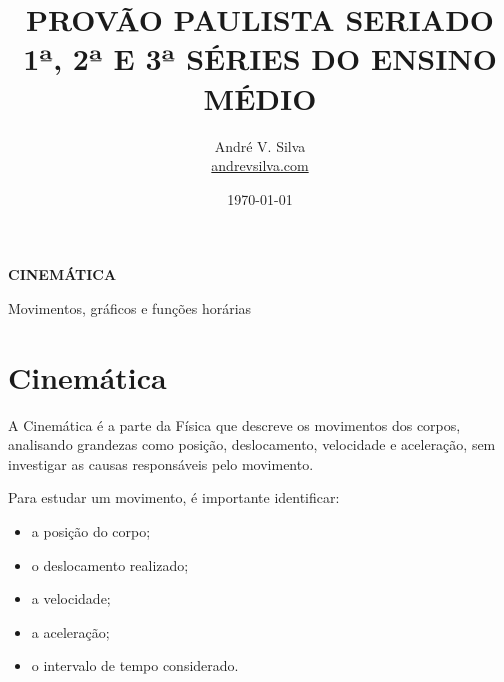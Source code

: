 \documentclass[a4paper,12pt]{article}
\title{
    \textbf{\large
    PROVÃO PAULISTA SERIADO\\[4pt]
    1ª, 2ª E 3ª SÉRIES DO ENSINO MÉDIO}
}
\author{
    André V. Silva\\[4pt]
    \href{https://andrevsilva.com/}{andrevsilva.com}
}
\date{\today}
\begin{document}

\maketitle

\begin{center}

\vspace{1cm}

{\Large\textbf{CINEMÁTICA}}

\vspace{0.5cm}

{\large Movimentos, gráficos e funções horárias}

\vspace{1cm}

\end{center}


\tableofcontents

\newpage


\section{Cinemática}

A Cinemática é a parte da Física que descreve os movimentos dos corpos,
analisando grandezas como posição, deslocamento, velocidade e aceleração,
sem investigar as causas responsáveis pelo movimento.

\begin{ideia}

Para estudar um movimento, é importante identificar:

\begin{itemize}

    \item a posição do corpo;

    \item o deslocamento realizado;

    \item a velocidade;

    \item a aceleração;

    \item o intervalo de tempo considerado.

\end{itemize}

\end{ideia}
\end{document}
